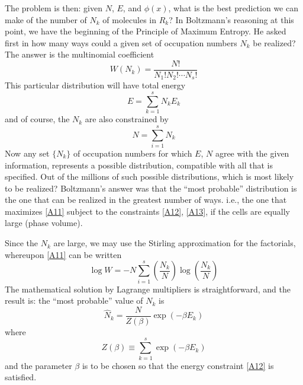 The problem is then: given $N$, $E$, and $\phi(x)$, what is the best prediction we can make of the number of $N_k$ of molecules in $R_k$?
In Boltzmann's reasoning at this point, we have the	beginning of the Principle of Maximum Entropy.
He asked first in how many ways could a given set of occupation numbers $N_k$ be realized?
The answer is the multinomial coefficient
\begin{equation}
	\label{A11}
	W(N_k) = \frac{N!}{N_1!N_2!\cdots N_s!}
\end{equation}
This particular distribution will have total energy
\begin{equation}
	\label{A12}
	E = \sum_{k=1}^{s} N_k E_k
\end{equation}
and of course, the $N_k$ are also constrained by
\begin{equation}
	\label{A13}
	N = \sum_{i=1}^{s} N_k
\end{equation}
Now any set $\{N_k\}$ of occupation numbers for which $E$, $N$ agree with the given information, represents a possible distribution, compatible with all that is specified.
Out of the millions of such possible distributions, which is most likely to be realized?
Boltzmann's answer was that the ``most probable'' distribution is the one that can be realized in the greatest number of ways. i.e., the one that maximizes \eqref{A11} subject to the constraints \eqref{A12}, \eqref{A13}, if the cells are equally large (phase volume).

Since the $N_k$ are large, we may use the Stirling approximation for the factorials, whereupon \eqref{A11} can be written
\begin{equation}
	\label{A14}
	\log W = -N \sum_{i=1}^{s} \left(\frac{N_k}{N}\right)\log \left(\frac{N_k}{N}\right)
\end{equation}
The mathematical solution by Lagrange multipliers is straightforward, and the result is: the ``most probable'' value of $N_k$ is
\begin{equation}
	\label{A15}
	\hat{N}_k = \frac{N}{Z(\beta)} \exp(-\beta E_k)
\end{equation}
where
\begin{equation}
	\label{A16}
	Z(\beta) \equiv \sum_{k=1}^{s} \exp(-\beta E_k)
\end{equation}
and the parameter $\beta$ is to be chosen so that the energy constraint \eqref{A12} is satisfied.

